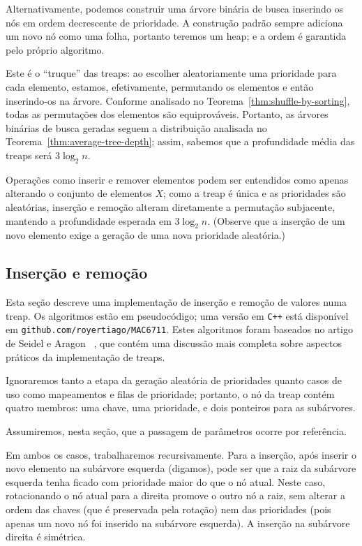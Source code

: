 Alternativamente,
podemos construir uma árvore binária de busca
inserindo os nós em ordem decrescente de prioridade.
A construção padrão sempre adiciona um novo nó como uma folha,
portanto teremos um heap;
e a ordem é garantida pelo próprio algoritmo.

Este é o ``truque'' das treaps:
ao escolher aleatoriamente uma prioridade para cada elemento,
estamos, efetivamente,
permutando os elementos e então inserindo-os na árvore.
Conforme analisado no Teorema~\ref{thm:shuffle-by-sorting},
todas as permutações dos elementos são equiprováveis.
Portanto,
as árvores binárias de busca geradas
seguem a distribuição analisada no Teorema~\ref{thm:average-tree-depth};
assim,
sabemos que a profundidade média das treaps será $3 \log_2 n$.

Operações como inserir e remover elementos
podem ser entendidos como apenas alterando o conjunto de elementos $X$;
como a treap é única e as prioridades são aleatórias,
inserção e remoção alteram diretamente a permutação subjacente,
mantendo a profundidade esperada em $3 \log_2 n$.
(Observe que a inserção de um novo elemento
exige a geração de uma nova prioridade aleatória.)

\subsection{Inserção e remoção}
Esta seção descreve uma implementação de inserção e remoção de valores numa treap.
Os algoritmos estão em pseudocódigo;
uma versão em \verb"C++" está disponível em
\verb"github.com/royertiago/MAC6711".
Estes algoritmos foram baseados no artigo de Seidel e Aragon~%
\cite[p.~450]{SeidelAragon1996},
que contém uma discussão mais completa sobre aspectos práticos da implementação de treaps.

Ignoraremos tanto a etapa da geração aleatória de prioridades
quanto casos de uso como mapeamentos e filas de prioridade;
portanto,
o nó da treap contém quatro membros:
uma chave, uma prioridade,
e dois ponteiros para as subárvores.

Assumiremos, nesta seção,
que a passagem de parâmetros ocorre por referência.

Em ambos os casos,
trabalharemos recursivamente.
Para a inserção,
após inserir o novo elemento na subárvore esquerda (digamos),
pode ser que a raiz da subárvore esquerda
tenha ficado com prioridade maior do que o nó atual.
Neste caso,
rotacionando o nó atual para a direita promove o outro nó a raiz,
sem alterar a ordem das chaves
(que é preservada pela rotação)
nem das prioridades
(pois apenas um novo nó foi inserido na subárvore esquerda).
A inserção na subárvore direita é simétrica.

